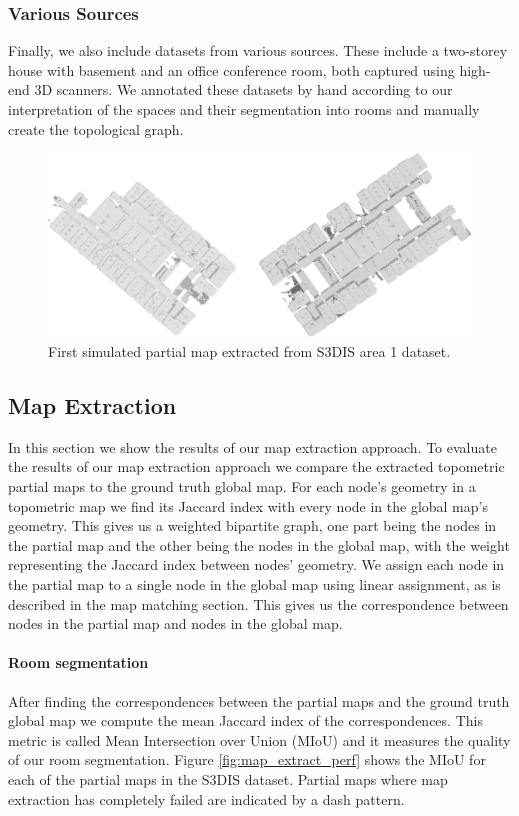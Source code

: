 \subsubsection{Various Sources}
Finally, we also include datasets from various sources. These include a two-storey house with basement and an office conference room, both captured using high-end 3D scanners. We annotated these datasets by hand according to our interpretation of the spaces and their segmentation into rooms and manually create the topological graph. 

\begin{figure}[h]
    \centering
    \includegraphics*[width=\textwidth]{./fig/area_1_partial.pdf}
    \caption{First simulated partial map extracted from S3DIS area 1 dataset.}
    \label{fig:area_1_partial_01}
\end{figure}

\pagebreak

\subsection{Map Extraction}
In this section we show the results of our map extraction approach. To evaluate the results of our map extraction approach we compare the extracted topometric partial maps to the ground truth global map. For each node's geometry in a topometric map we find its Jaccard index with every node in the global map's geometry. This gives us a weighted bipartite graph, one part being the nodes in the partial map and the other being the nodes in the global map, with the weight representing the Jaccard index between nodes' geometry. We assign each node in the partial map to a single node in the global map using linear assignment, as is described in the map matching section. This gives us the correspondence between nodes in the partial map and nodes in the global map.

\paragraph{Room segmentation}
After finding the correspondences between the partial maps and the ground truth global map we compute the mean Jaccard index of the correspondences. This metric is called Mean Intersection over Union (MIoU) and it measures the quality of our room segmentation. Figure \ref{fig:map_extract_perf} shows the MIoU for each of the partial maps in the S3DIS dataset. Partial maps where map extraction has completely failed are indicated by a dash pattern.

